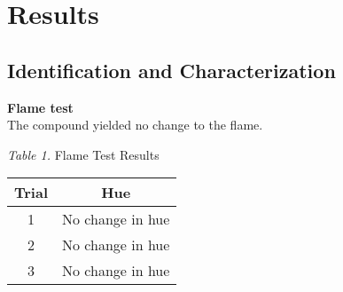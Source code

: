 \documentclass[12pt]{article}
\begin{document}
\section{Results}\singlespacing
\subsection{Identification and Characterization}
\textbf{Flame test}
\\The compound yielded no change to the flame.
\begin{center}
\textit{Table 1.} Flame Test Results\\
\vspace{10pt}
\begin{tabular}{|c|c|}
\hline 
Trial  & Hue \\ 
\hline 
1 & No change in hue \\ 
\hline 
2 & No change in hue \\ 
\hline 
3 & No change in hue \\ 
\hline 
\end{tabular} 
\end{center}
\end{document}
